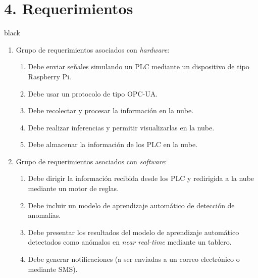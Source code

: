 \documentclass[11pt]{charter}
\begin{document}
\section{4. Requerimientos}
\label{sec:requerimientos}
\begin{consigna}{black}
\begin{enumerate}
\item Grupo de requerimientos asociados con \textit{hardware}:
	\begin{enumerate}
	\item Debe enviar señales simulando un PLC mediante un dispositivo de tipo Raspberry Pi.
	\item Debe usar un protocolo de tipo OPC-UA.
	\item Debe recolectar y procesar la información en la nube.
	\item Debe realizar inferencias y permitir visualizarlas en la nube.
	\item Debe almacenar la información de los PLC en la nube.
	\end{enumerate}
\item Grupo de requerimientos asociados con \textit{software}:
	\begin{enumerate}
	\item Debe dirigir la información recibida desde los PLC y redirigida a la nube mediante un motor de reglas.
	\item Debe incluir un modelo de aprendizaje automático de detección de anomalías.
	\item Debe presentar los resultados del modelo de aprendizaje automático detectados como anómalos en \textit{near real-time} mediante un tablero.
	\item Debe generar notificaciones (a ser enviadas a un correo electrónico o mediante SMS).
	\end{enumerate}
\end{enumerate}

\end{consigna}
\end{document}

